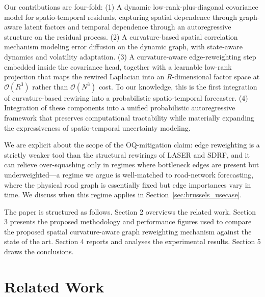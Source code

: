\documentclass{article}
\theoremstyle{plain}
\theoremstyle{definition}
\theoremstyle{remark}
\begin{document}
Our contributions are four-fold: (1) A dynamic low-rank-plus-diagonal covariance model for
    spatio-temporal residuals, capturing spatial dependence through
    graph-aware latent factors and temporal dependence through an
    autoregressive structure on the residual process. (2) A curvature-based spatial correlation mechanism modeling error diffusion on the dynamic graph, with state-aware dynamics and volatility adaptation.
  (3) A curvature-aware edge-reweighting step embedded inside the
    covariance head, together with a learnable low-rank projection that maps
    the rewired Laplacian into an $R$-dimensional factor space at
    $\mathcal{O}(R^3)$ rather than $\mathcal{O}(N^3)$ cost. To our
    knowledge, this is the first integration of curvature-based rewiring
    into a probabilistic spatio-temporal forecaster.
  (4) Integration of these components into a unified probabilistic
    autoregressive framework that preserves computational tractability while
    materially expanding the expressiveness of spatio-temporal uncertainty
    modeling.

We are explicit about the scope of the OQ-mitigation claim: edge reweighting is a strictly weaker tool than the structural rewirings of LASER and SDRF, and it can relieve over-squashing only in regimes where bottleneck edges are present but underweighted---a regime we argue is well-matched to road-network forecasting, where the physical road graph is essentially fixed but edge importances vary in time. We discuss when this regime applies in Section~\ref{sec:brussels_usecase}.

The paper is structured as follows. Section 2 overviews the related work. Section 3 presents the proposed methodology and performance figures used to compare the proposed spatial curvature-aware graph reweighting mechanism against the state of the art. Section 4 reports and analyses the experimental results. Section 5 draws the conclusions.



\section{Related Work}
\end{document}
